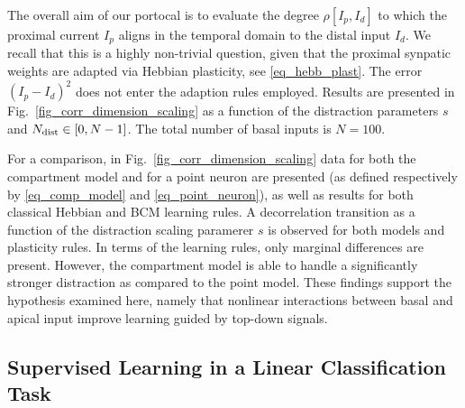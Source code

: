\documentclass[utf8]{frontiersSCNS} %
\begin{document}
The overall aim of our portocal is to evaluate
the degree $\rho[I_p,I_d]$ to which
the proximal current $I_p$ aligns in the
temporal domain to the distal input $I_d$.
We recall that this is a highly non-trivial
question, given that the proximal synpatic
weights are adapted via Hebbian plasticity, 
see \eqref{eq_hebb_plast}. The error 
$(I_p-I_d)^2$ does not
enter the adaption rules employed.
Results are presented in
Fig.~\ref{fig_corr_dimension_scaling}
as a function of the distraction parameters 
$s$ and $N_{\rm dist}\in[0,N-1]$. The
total number of basal inputs is $N=100$.

For a comparison, in 
Fig.~\ref{fig_corr_dimension_scaling}
data for both the compartment model
and for a point neuron are presented
(as defined respectively by \eqref{eq_comp_model}
and \eqref{eq_point_neuron}), as well as results for both 
classical Hebbian and BCM learning rules. A decorrelation 
transition as a function of the distraction 
scaling paramerer $s$ is observed for both 
models and plasticity rules. In terms of the learning rules,
only marginal differences are present. 
However, the compartment model is able
to handle a significantly stronger distraction 
as compared to the point model. These findings
support the hypothesis examined here, namely
that nonlinear interactions between basal and 
apical input improve learning guided by top-down signals.

\subsection{Supervised Learning in a Linear Classification Task}
\label{sect:classification}
\end{document}
